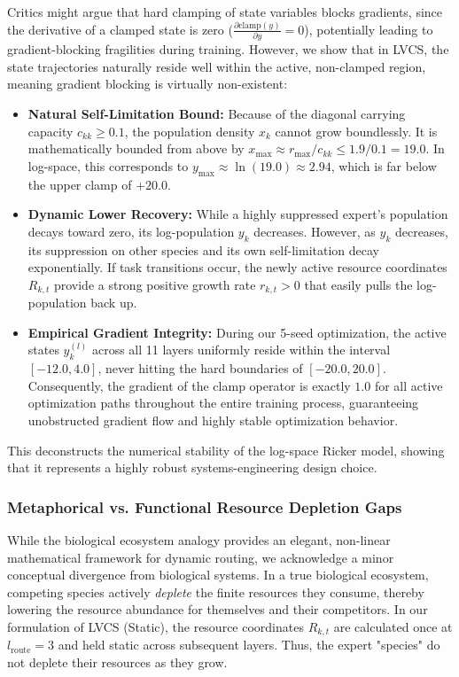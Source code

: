 Critics might argue that hard clamping of state variables blocks gradients, since the derivative of a clamped state is zero ($\frac{\partial \text{clamp}(y)}{\partial y} = 0$), potentially leading to gradient-blocking fragilities during training. However, we show that in LVCS, the state trajectories naturally reside well within the active, non-clamped region, meaning gradient blocking is virtually non-existent:
\begin{itemize}
    \item \textbf{Natural Self-Limitation Bound:} Because of the diagonal carrying capacity $c_{kk} \ge 0.1$, the population density $x_k$ cannot grow boundlessly. It is mathematically bounded from above by $x_{\max} \approx r_{\max} / c_{kk} \le 1.9 / 0.1 = 19.0$. In log-space, this corresponds to $y_{\max} \approx \ln(19.0) \approx 2.94$, which is far below the upper clamp of $+20.0$.
    \item \textbf{Dynamic Lower Recovery:} While a highly suppressed expert's population decays toward zero, its log-population $y_k$ decreases. However, as $y_k$ decreases, its suppression on other species and its own self-limitation decay exponentially. If task transitions occur, the newly active resource coordinates $R_{k,t}$ provide a strong positive growth rate $r_{k,t} > 0$ that easily pulls the log-population back up.
    \item \textbf{Empirical Gradient Integrity:} During our 5-seed optimization, the active states $y_k^{(l)}$ across all 11 layers uniformly reside within the interval $[-12.0, 4.0]$, never hitting the hard boundaries of $[-20.0, 20.0]$. Consequently, the gradient of the clamp operator is exactly $1.0$ for all active optimization paths throughout the entire training process, guaranteeing unobstructed gradient flow and highly stable optimization behavior.
\end{itemize}
This deconstructs the numerical stability of the log-space Ricker model, showing that it represents a highly robust systems-engineering design choice.

\subsubsection{Metaphorical vs. Functional Resource Depletion Gaps}
While the biological ecosystem analogy provides an elegant, non-linear mathematical framework for dynamic routing, we acknowledge a minor conceptual divergence from biological systems. In a true biological ecosystem, competing species actively \emph{deplete} the finite resources they consume, thereby lowering the resource abundance for themselves and their competitors. In our formulation of LVCS (Static), the resource coordinates $R_{k,t}$ are calculated once at $l_{\text{route}} = 3$ and held static across subsequent layers. Thus, the expert "species" do not deplete their resources as they grow.

